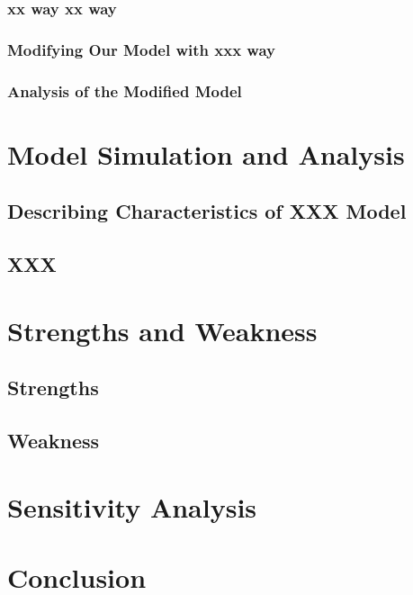 \documentclass[13pt]{article}
\begin{document}
\subsubsection{xx way xx way}
\lipsum[4]
\subsubsection{Modifying Our Model with xxx way}
\lipsum[4]
\subsubsection{Analysis of the Modified Model}
\lipsum[4]

\section{Model Simulation and Analysis}%
\lipsum[4]
\cite{characteristic}
\subsection{Describing Characteristics of XXX Model}
\lipsum[4]
\subsection{XXX}
\lipsum[4]

\section{Strengths and Weakness}
\lipsum[4]
\subsection{Strengths}
\lipsum[4]
\subsection{Weakness}
\lipsum[4]

\section{Sensitivity Analysis}
\lipsum[4]

\section{Conclusion}
\lipsum[4]

\newpage
\fancyhf{}
\fancyhead[R]{ }
\fancyhead[L]{ }


\Large
\end{document}
